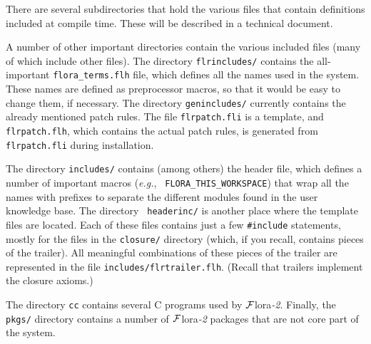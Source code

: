 \documentclass[11pt]{article}
\newcommand{\FLORA}{{\mbox{\sc ${\cal F}${lora}\rm\emph{-2}}}\xspace}
\newcommand{\FLSYSTEM}{\FLORA}
\begin{document}
{There are several subdirectories that hold the various files that contain
definitions included at compile time. These will be described in a
technical document.

A number of other important directories contain the various included files
(many of which include other files). The directory {\tt flrincludes/}
contains the all-important {\tt flora\_terms.flh} file, which defines all
the names used in the system. These names are defined as preprocessor
macros, so that it would be easy to change them, if necessary.
The directory {\tt genincludes/} currently contains the already mentioned
patch rules. The file {\tt flrpatch.fli} is a template, and {\tt
  flrpatch.flh}, which contains the actual patch rules, is generated from
{\tt flrpatch.fli} during installation.

The directory {\tt includes/} contains (among others) the header file,
which defines a number of important macros ({\it e.g.}, {\tt
  FLORA\_THIS\_WORKSPACE}) that wrap all the names with prefixes to
separate the different modules found in the user knowledge base.  The directory {\tt
  headerinc/} is another place where the template files are located. Each
of these files contains just a few {\tt \#include} statements, mostly for
the files in the {\tt closure/} directory (which, if you recall, contains
pieces of the trailer). All meaningful combinations of these pieces of the
trailer are represented in the file {\tt includes/flrtrailer.flh}.  (Recall
that trailers implement the closure axioms.)

The directory {\tt cc} contains several C programs used by \FLSYSTEM.
Finally, the {\tt
  pkgs/} directory contains a number of \FLSYSTEM packages that are not
core part of the system.
}

\newpage



\printindex
\end{document}

